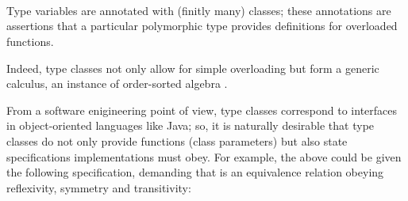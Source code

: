 \begin{isabellebody}
\begin{isamarkuptext}
  \medskip\noindent\hspace*{2ex} \\
  \hspace*{4ex}

  \medskip\noindent\hspace*{2ex} \\
  \hspace*{4ex} \\
  \hspace*{4ex}

  \medskip\noindent Type variables are annotated with (finitly many) classes;
  these annotations are assertions that a particular polymorphic type
  provides definitions for overloaded functions.

  Indeed, type classes not only allow for simple overloading
  but form a generic calculus, an instance of order-sorted
  algebra \cite{Nipkow-Prehofer:1993,nipkow-sorts93,Wenzel:1997:TPHOL}.

  From a software enigineering point of view, type classes
  correspond to interfaces in object-oriented languages like Java;
  so, it is naturally desirable that type classes do not only
  provide functions (class parameters) but also state specifications
  implementations must obey.  For example, the 
  above could be given the following specification, demanding that
   is an equivalence relation obeying reflexivity,
  symmetry and transitivity:

  \medskip\noindent\hspace*{2ex} \\
  \hspace*{4ex} \\
  \hspace*{2ex} \\
  \hspace*{4ex} \\
  \hspace*{4ex} \\
  \hspace*{4ex}


\end{isamarkuptext}
\end{isabellebody}
